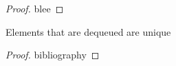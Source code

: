 \documentclass[a4paper,USenglish]{lipics-v2021} %
\begin{document}
\begin{proof}
  blee
\end{proof}

\begin{lemma}
  Elements that are dequeued are unique
\end{lemma}

\begin{proof}
  bibliography
\end{proof}



\end{document}
